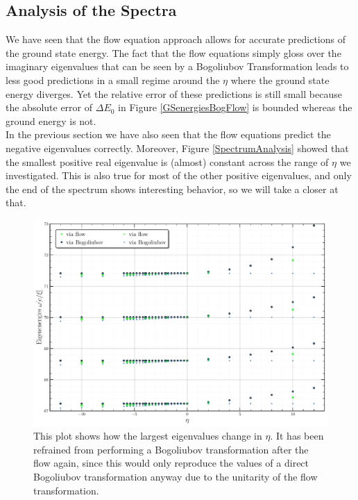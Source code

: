 \subsection{Analysis of the Spectra}
We have seen that the flow equation approach allows for accurate predictions of the ground state energy. The fact that the flow equations simply gloss over the imaginary eigenvalues that can be seen by a Bogoliubov Transformation leads to less good predictions in a small regime around the $\eta$ where the ground state energy diverges. Yet the relative error of these predictions is still small because the absolute error of $\Delta E_0$ in Figure \ref{GSenergiesBogFlow} is bounded whereas the ground energy is not.\\
In the previous section we have also seen that the flow equations predict the negative eigenvalues correctly. Moreover,  Figure \ref{SpectrumAnalysis} showed that the smallest positive real eigenvalue is (almost) constant across the range of $\eta$ we investigated. This is also true for most of the other positive eigenvalues, and only the end of the spectrum shows interesting behavior, so we will take a closer at that.
\begin{figure}[H]
    \centering
    \includegraphics[width=\textwidth]{figures/plots/PDF/SpectralAnalysis.pdf}
    \caption[End of the spectrum of the Hamiltonian for different $\eta$]{This plot shows how the largest eigenvalues change in $\eta$. It has been refrained from performing a Bogoliubov transformation after the flow again, since this would only reproduce the values of a direct Bogoliubov transformation anyway due to the unitarity of the flow transformation.
}
    \label{EndOfSpectrumAnalysis}
\end{figure}
